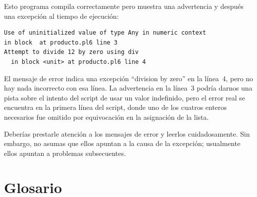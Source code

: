 Esto programa compila correctamente pero muestra una
advertencia y después una excepción al tiempo de ejecución:

\begin{lstlisting}
Use of uninitialized value of type Any in numeric context 
in block  at producto.pl6 line 3
Attempt to divide 12 by zero using div
  in block <unit> at producto.pl6 line 4
\end{lstlisting}
%

El mensaje de error indica una excepción ``division by zero''
en la línea~4, pero no hay nada
incorrecto con esa línea. La advertencia en la línea~3
podría darnos una pista sobre el intento del script 
de usar un valor indefinido, pero el error real se encuentra 
en la primera línea del script, donde uno de los cuatros 
enteros necesarios fue omitido por equivocación en la
asignación de la lista.


Deberías prestarle atención a los mensajes de error y leerlos
cuidadosamente. Sin embargo, no asumas que ellos apuntan a la
causa de la excepción; usualmente ellos apuntan 
a problemas subsecuentes.


\section{Glosario}


